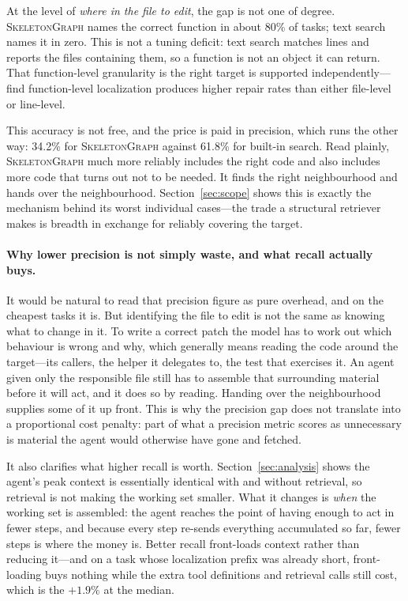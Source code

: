 \documentclass[11pt,letterpaper]{article}
\newcommand{\sg}{\textsc{SkeletonGraph}}
\begin{document}
At the level of \emph{where in the file to edit}, the gap is not one of degree.
\sg{} names the correct function in about 80\% of tasks; text search names it in zero.
This is not a tuning deficit: text search matches lines and reports the files
containing them, so a function is not an object it can return. That function-level
granularity is the right target is supported independently---\citet{granularity}
find function-level localization produces higher repair rates than either
file-level or line-level.

This accuracy is not free, and the price is paid in precision, which runs the
other way: 34.2\% for \sg{} against 61.8\% for built-in search. Read plainly,
\sg{} much more reliably includes the right code and also includes more code that
turns out not to be needed. It finds the right neighbourhood and hands over the
neighbourhood. Section~\ref{sec:scope} shows this is exactly the mechanism behind
its worst individual cases---the trade a structural retriever makes is breadth in
exchange for reliably covering the target.

\paragraph{Why lower precision is not simply waste, and what recall actually buys.}
It would be natural to read that precision figure as pure overhead, and on the
cheapest tasks it is. But identifying the file to edit is not the same as knowing
what to change in it. To write a correct patch the model has to work out which
behaviour is wrong and why, which generally means reading the code around the
target---its callers, the helper it delegates to, the test that exercises it. An
agent given only the responsible file still has to assemble that surrounding
material before it will act, and it does so by reading. Handing over the
neighbourhood supplies some of it up front. This is why the precision gap does not
translate into a proportional cost penalty: part of what a precision metric scores
as unnecessary is material the agent would otherwise have gone and fetched.

It also clarifies what higher recall is worth. Section~\ref{sec:analysis} shows the
agent's peak context is essentially identical with and without retrieval, so
retrieval is not making the working set smaller. What it changes is \emph{when} the
working set is assembled: the agent reaches the point of having enough to act in
fewer steps, and because every step re-sends everything accumulated so far, fewer
steps is where the money is. Better recall front-loads context rather than reducing
it---and on a task whose localization prefix was already short, front-loading buys
nothing while the extra tool definitions and retrieval calls still cost, which is
the $+1.9\%$ at the median.
\end{document}
